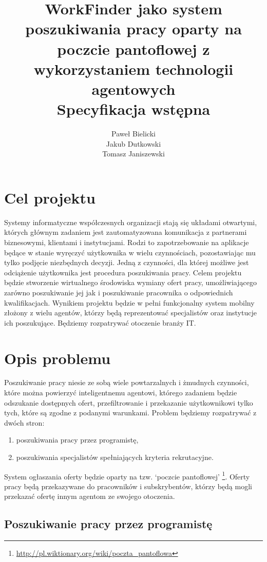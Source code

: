 \documentclass[11pt,a4paper]{article}
\author{
	Paweł Bielicki\\
	Jakub Dutkowski\\
	Tomasz Janiszewski
}
\title{
	\huge{WorkFinder jako system poszukiwania pracy oparty na poczcie pantoflowej z wykorzystaniem technologii agentowych}\\
	\LARGE{Specyfikacja wstępna}
 }
\begin{document}
\maketitle

\listoftodos
\newpage

\section{Cel projektu}
Systemy informatyczne współczesnych organizacji stają się układami otwartymi, których głównym zadaniem jest zautomatyzowana komunikacja z partnerami biznesowymi, klientami i instytucjami. Rodzi to zapotrzebowanie na aplikacje będące w stanie wyręczyć użytkownika w wielu czynnościach, pozostawiając mu tylko podjęcie niezbędnych decyzji.
Jedną z czynności, dla której możliwe jest odciążenie użytkownika jest procedura poszukiwania pracy. Celem projektu będzie stworzenie wirtualnego środowiska wymiany ofert pracy, umożliwiającego zarówno poszukiwanie jej jak i poszukiwanie pracownika o odpowiednich kwalifikacjach.
Wynikiem projektu będzie w pełni funkcjonalny system mobilny złożony z wielu agentów, którzy będą reprezentować specjalistów oraz instytucje ich poszukujące. Będziemy rozpatrywać otoczenie branży IT.

\section{Opis problemu}

Poszukiwanie pracy niesie ze sobą wiele powtarzalnych i żmudnych czynności, które można powierzyć inteligentnemu agentowi, którego zadaniem będzie odszukanie dostępnych ofert, przefiltrowanie i przekazanie użytkownikowi tylko tych, które są zgodne z podanymi warunkami.
Problem będziemy rozpatrywać z dwóch stron:
\begin{enumerate}
	\item poszukiwania pracy przez programistę,
	\item poszukiwania specjalistów spełniających kryteria rekrutacyjne.
\end{enumerate}

System ogłaszania oferty będzie oparty na tzw. `poczcie pantoflowej' \footnote{\url{http://pl.wiktionary.org/wiki/poczta_pantoflowa}}. Oferty pracy będą przekazywane do pracowników i subskrybentów, którzy będą mogli przekazać ofertę innym agentom ze swojego otoczenia.


\subsection{Poszukiwanie pracy przez programistę}
\end{document}
